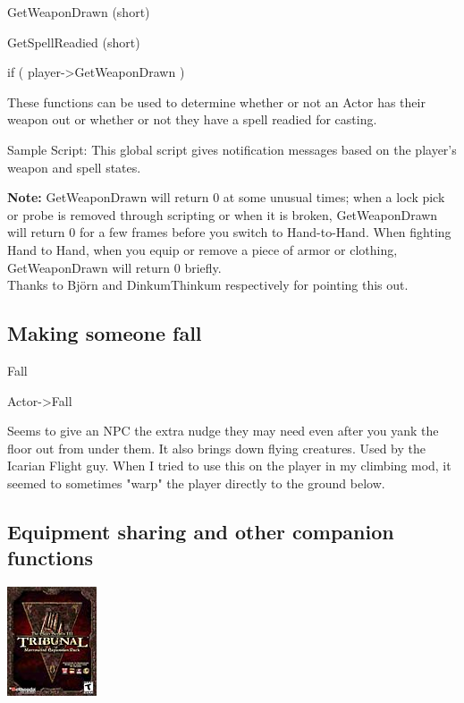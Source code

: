 \documentclass[
]{article}
\begin{document}
GetWeaponDrawn (short)

GetSpellReadied (short)

if ( player-\textgreater GetWeaponDrawn )

These functions can be used to determine whether or not an Actor has
their weapon out or whether or not they have a spell readied for
casting.

Sample Script: This global script gives notification messages based on
the player's weapon and spell states.



\textbf{Note:} GetWeaponDrawn will return 0 at some unusual times; when
a lock pick or probe is removed through scripting or when it is broken,
GetWeaponDrawn will return 0 for a few frames before you switch to
Hand-to-Hand. When fighting Hand to Hand, when you equip or remove a
piece of armor or clothing, GetWeaponDrawn will return 0 briefly.\\
Thanks to Björn and DinkumThinkum respectively for pointing this out.

\hypertarget{section-7}{%
\subsection{}\label{section-7}}

\hypertarget{making-someone-fall}{%
\subsection{Making someone fall}\label{making-someone-fall}}

Fall

Actor-\textgreater Fall

Seems to give an NPC the extra nudge they may need even after you yank
the floor out from under them. It also brings down flying creatures.
Used by the Icarian Flight guy. When I tried to use this on the player
in my climbing mod, it seemed to sometimes "warp" the player directly to
the ground below.

\hypertarget{equipment-sharing-and-other-companion-functions}{%
\subsection{Equipment sharing and other companion
functions}\label{equipment-sharing-and-other-companion-functions}}

\includegraphics{media/image6.png}
\end{document}
